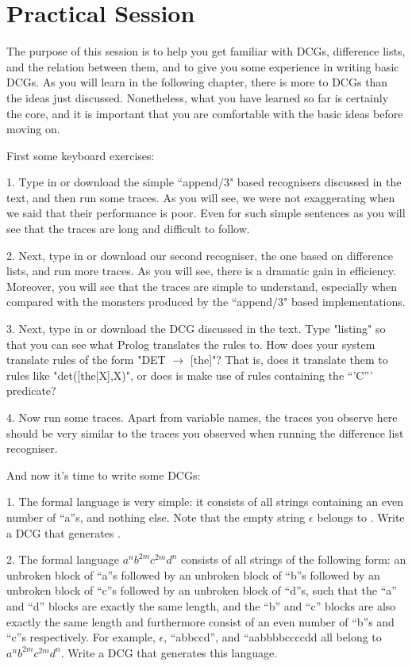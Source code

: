 \section{Practical Session}\label{SEC.L7.PRAXIS}



The purpose of this session is to help you get familiar with DCGs,
difference lists, and the relation between them, and to give you some
experience in writing basic DCGs.  As you will learn in the following
chapter, there is more to DCGs than the ideas just
discussed. Nonetheless, what you have learned so far is certainly the
core, and it is important that you are comfortable with the basic
ideas before moving on.

First some keyboard exercises:


1. Type in or download the simple ``append/3" based recognisers
discussed in the text, and then run some traces.  As you will see, we
were not exaggerating when we said that their performance is
poor. Even for such simple sentences as 
you will see that the traces are long and difficult to follow.

2. Next, type in or download our second recogniser, the one based
on difference lists, and run more traces. As you will see, there is a
dramatic gain in efficiency. Moreover, you will see that the traces
are  simple to understand, especially when compared with the
monsters produced by the ``append/3" based implementations.

3. Next, type in or download the DCG discussed in the text.  Type
"listing" so that you can see what Prolog translates the rules
to. How does your system translate rules of the form   
"DET $\rightarrow$ [the]"? That is, does it translate them to rules like
"det([the|X],X)", or does is make use of rules
containing the ``'C''' predicate?

4. Now run some traces. Apart from variable names, the traces you
observe here should be very similar to the traces you observed when
running the difference list recogniser.

And now it's time to write some DCGs:


1. The formal language  is very simple: it consists of
all strings containing an even number of ``a''s, and nothing else.
Note that the empty string $\epsilon$ belongs to .
Write a DCG that generates .

2. The formal language $a^nb^{2m}c^{2m}d^{n}$ consists of all
strings of the following form: an unbroken block of ``a''s followed
by an unbroken block of ``b''s followed by an unbroken block of
``c''s followed by an unbroken block of ``d''s, such that the ``a''
and ``d'' blocks are exactly the same length, and the ``b'' and
``c'' blocks are also exactly the same length and furthermore consist of
an even number of ``b''s and ``c''s respectively. For example, $\epsilon$,
``abbccd'', and ``aabbbbccccdd all belong to
$a^nb^{2m}c^{2m}d^{n}$.  Write a DCG that generates this
language.

